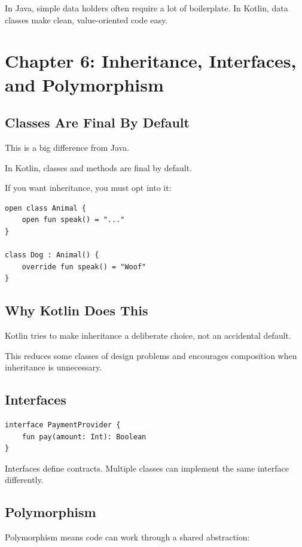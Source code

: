 \documentclass[11pt,a4paper]{article}
\begin{document}
In Java, simple data holders often require a lot of boilerplate.
In Kotlin, data classes make clean, value-oriented code easy.

\section{Chapter 6: Inheritance, Interfaces, and Polymorphism}

\subsection{Classes Are Final By Default}

This is a big difference from Java.

In Kotlin, classes and methods are final by default.

If you want inheritance, you must opt into it:

\begin{lstlisting}[style=kazekotlin]
open class Animal {
    open fun speak() = "..."
}

class Dog : Animal() {
    override fun speak() = "Woof"
}
\end{lstlisting}

\subsection{Why Kotlin Does This}

Kotlin tries to make inheritance a deliberate choice, not an accidental default.

This reduces some classes of design problems and encourages composition when inheritance is unnecessary.

\subsection{Interfaces}

\begin{lstlisting}[style=kazekotlin]
interface PaymentProvider {
    fun pay(amount: Int): Boolean
}
\end{lstlisting}

Interfaces define contracts. Multiple classes can implement the same interface differently.

\subsection{Polymorphism}

Polymorphism means code can work through a shared abstraction:
\end{document}
